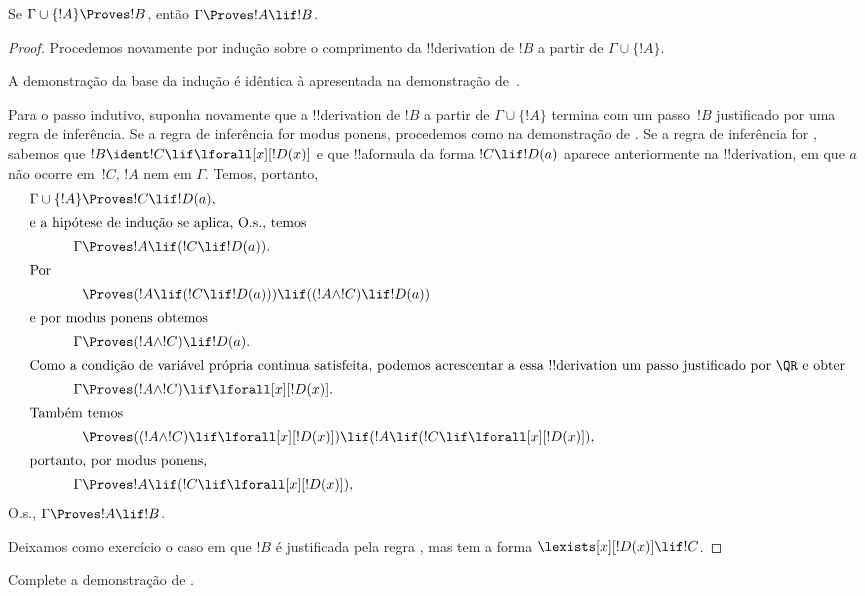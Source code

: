 \documentclass[../../../include/open-logic-section]{subfiles}
\begin{document}


\begin{thm}
 Se $\Gamma \cup \{!A\} \Proves !B$,
então $\Gamma \Proves !A \lif !B$.
\end{thm}

\begin{proof}
Procedemos novamente por indução sobre o comprimento
da !!{derivation} de $!B$ a partir de $\Gamma \cup \{!A\}$.

A demonstração da base da indução é idêntica à apresentada na
demonstração de~.

Para o passo indutivo, suponha novamente que a !!{derivation} de $!B$
a partir de $\Gamma \cup \{!A\}$ termina com um passo~$!B$ justificado por
uma regra de inferência. Se a regra de inferência for modus ponens,
procedemos como na demonstração de . Se a
regra de inferência for \QR, sabemos que $!B \ident !C \lif \lforall[x][!D(x)]$
e que !!a{formula} da forma $!C \lif !D(a)$ aparece anteriormente na
!!{derivation}, em que $a$ não ocorre em~$!C$, $!A$ nem em $\Gamma$. Temos,
portanto,
\begin{align*}
  \Gamma \cup \{!A\} & \Proves !C \lif !D(a),\\
  \intertext{e a hipótese de indução se aplica, O.s.\@, temos}
    \Gamma & \Proves !A \lif (!C \lif !D(a)).\\
  \intertext{Por}
  & \Proves (!A \lif (!C \lif !D(a))) \lif ((!A \land !C) \lif !D(a))\\
  \intertext{e por modus ponens obtemos}
  \Gamma & \Proves (!A \land !C) \lif !D(a).\\
  \intertext{Como a condição de variável própria continua satisfeita, podemos acrescentar a essa !!{derivation} um passo justificado por \QR e obter}
    \Gamma & \Proves (!A \land !C) \lif \lforall[x][!D(x)].\\
    \intertext{Também temos}
    & \Proves ((!A \land !C) \lif \lforall[x][!D(x)]) \lif (!A \lif (!C \lif \lforall[x][!D(x)]),\\
    \intertext{portanto, por modus ponens,}
    \Gamma & \Proves !A \lif (!C \lif \lforall[x][!D(x)]),
\end{align*}
O.s.\@, $\Gamma \Proves !A \lif !B$.

Deixamos como exercício o caso em que $!B$ é justificada pela regra \QR,
mas tem a forma $\lexists[x][!D(x)] \lif !C$.
\end{proof}

\begin{prob}
  Complete a demonstração de .
\end{prob}
\end{document}

